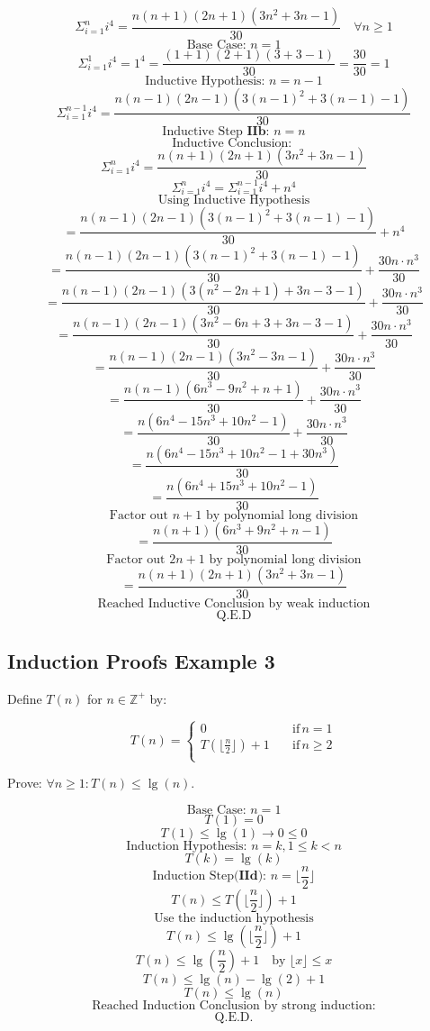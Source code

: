 \documentclass{article}
\begin{document}
$$\Sigma_{i=1}^{n} i^4 = \frac{n(n + 1)(2n + 1)(3n^2 + 3n - 1)}{30} \quad \forall n \ge 1$$
$$\text{Base Case: } n = 1$$
$$\Sigma_{i=1}^{1} i^4  = 1^4 = \frac{(1 + 1)(2 + 1)(3 + 3 - 1)}{30} = \frac{30}{30} = 1 $$
$$\text{Inductive Hypothesis: } n = n - 1$$
$$\Sigma_{i=1}^{n - 1} i^4 = \frac{n(n - 1)(2n - 1)(3(n -1)^2 + 3(n-1) - 1)}{30} $$
$$\text{Inductive Step } \textbf{IIb} \text{: } n = n$$
$$\text{Inductive Conclusion: }$$
$$\Sigma_{i=1}^{n} i^4 = \frac{n(n+1)(2n +1)(3n ^2 + 3n - 1)}{30} $$
$$\Sigma_{i=1}^{n} i^4 =  \Sigma_{i=1}^{n-1} i^4 + n^4$$
$$\text{Using Inductive Hypothesis}$$
$$= \frac{n(n - 1)(2n - 1)(3(n -1)^2 + 3(n-1) - 1)}{30} + n^4$$
$$= \frac{n(n - 1)(2n - 1)(3(n -1)^2 + 3(n-1) - 1)}{30} + \frac{30n \cdot n^3}{30}$$
$$= \frac{n(n - 1)(2n - 1)(3(n^2 - 2n + 1) + 3n- 3 - 1)}{30} + \frac{30n \cdot n^3}{30}$$
$$= \frac{n(n - 1)(2n - 1)(3n^2 - 6n + 3 + 3n - 3 - 1)}{30} + \frac{30n \cdot n^3}{30}$$
$$= \frac{n(n - 1)(2n - 1)(3n^2 - 3n - 1)}{30} + \frac{30n \cdot n^3}{30}$$
$$= \frac{n(n - 1)(6n^3 - 9n^2 + n + 1)}{30} + \frac{30n \cdot n^3}{30}$$
$$= \frac{n(6n^4 - 15n^3 + 10n^2 - 1)}{30} + \frac{30n \cdot n^3}{30}$$
$$= \frac{n(6n^4 - 15n^3 + 10n^2 - 1 + 30n^3)}{30} $$
$$= \frac{n(6n^4 + 15n^3 + 10n^2 - 1)}{30} $$
$$\text{Factor out } n+1 \text{ by polynomial long division}$$
$$= \frac{n(n+1)(6n^3 + 9n^2 + n - 1)}{30} $$
$$\text{Factor out } 2n+1 \text{ by polynomial long division}$$
$$= \frac{n(n+1)(2n+1)(3n^2 + 3n - 1)}{30} $$
$$\text{Reached Inductive Conclusion by weak induction}$$
$$\text{Q.E.D}$$

\subsection{Induction Proofs Example 3}
Define $T(n)$ for $n \in \mathbb{Z}^+$ by:

\begin{equation*}
T(n)=\begin{cases}
          0 \quad &\text{if} \, n = 1 \\
          T(\lfloor \frac{n}{2} \rfloor) + 1\quad &\text{if} \, n \ge 2\\
     \end{cases}
\end{equation*}

Prove: $\forall n \ge 1: T(n) \le \lg(n)$.

$$\text{Base Case: } n = 1$$
$$T(1) = 0$$
$$T(1) \le \lg(1) \rightarrow 0 \le 0$$
$$\text{Induction Hypothesis: } n = k, 1 \le k < n $$
$$T(k) = \lg(k)$$
$$\text{Induction Step(} \textbf{IId} \text{): } n = \lfloor \frac{n}{2} \rfloor$$
$$T(n) \le T(\lfloor \frac{n}{2} \rfloor) + 1$$
$$\text{Use the induction hypothesis}$$
$$T(n) \le \lg(\lfloor \frac{n}{2} \rfloor) + 1$$
$$T(n) \le \lg(\frac{n}{2}) + 1 \quad \text{by } \lfloor x \rfloor \le x$$
$$T(n) \le \lg(n) - \lg(2) + 1 $$
$$T(n) \le \lg(n) $$
$$\text{Reached Induction Conclusion by strong induction:}$$
$$\text{Q.E.D.}$$
\end{document}
